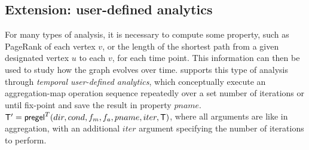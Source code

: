 \subsection{Extension: user-defined analytics}
\label{sec:analytics}

For many types of analysis, it is necessary to compute some property,
such as PageRank of each vertex $v$, or the length of the shortest
path from a given designated vertex $u$ to each $v$, for each time
point.  This information can then be used to study how the graph
evolves over time.  \ql supports this type of analysis through {\em
  temporal user-defined analytics}, which conceptually execute an
aggregation-map operation sequence repeatedly over a set number of
iterations or until fix-point and save the result in property $pname$.
$\mathsf{T}' = \textsf{pregel}^T (dir,cond,f_m,f_a,pname,iter,\mathsf{T})$, where
all arguments are like in aggregation, with an additional $iter$
argument specifying the number of iterations to perform.



  
